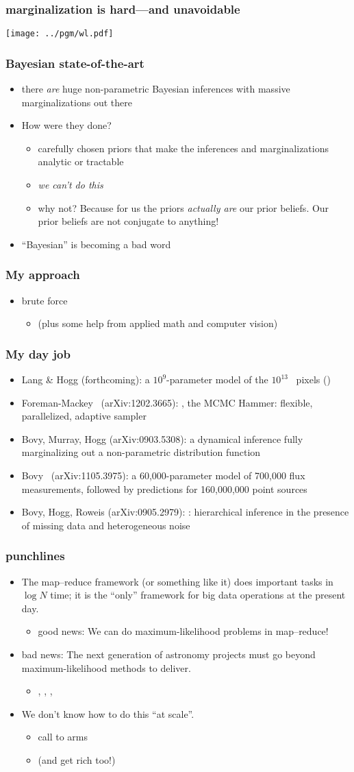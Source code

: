 \documentclass[pdftex]{beamer}
\newcommand{\conclusion}{
\begin{frame}
  \frametitle{punchlines}
  \begin{itemize}
  \item The map--reduce framework (or something like it) does
    important tasks in $\log N$ time; it is the ``only'' framework
    for big data operations at the present day.
    \begin{itemize}
    \item good news: We can do maximum-likelihood problems in map--reduce!
    \end{itemize}
  \item bad news:  The next generation of astronomy projects must go beyond
    maximum-likelihood methods to deliver.
    \begin{itemize}
    \item \gaia, \lsst, \euclid, \etc
    \end{itemize}
  \item We don't know how to do this ``at scale''.
    \begin{itemize}
    \item call to arms
    \item (and get rich too!)
    \end{itemize}
  \end{itemize}
\end{frame}
}
\begin{document}
\begin{frame}
  \frametitle{marginalization is hard---and unavoidable}
  \texttt{[image: ../pgm/wl.pdf]}
\end{frame}

\begin{frame}
  \frametitle{Bayesian state-of-the-art}
  \begin{itemize}
  \item there \emph{are} huge non-parametric Bayesian inferences with
    massive marginalizations out there
  \item How were they done?
    \begin{itemize}
    \item carefully chosen priors that make the inferences and
      marginalizations analytic or tractable
    \item \emph{we can't do this}
    \item why not?  Because for us the priors \emph{actually are} our
      prior beliefs.  Our prior beliefs are not conjugate to anything!
    \end{itemize}
  \item ``Bayesian'' is becoming a bad word
  \end{itemize}
\end{frame}

\begin{frame}
  \frametitle{My approach}
  \begin{itemize}
  \item brute force
    \begin{itemize}
    \item (plus some help from applied math and computer vision)
    \end{itemize}
  \end{itemize}
\end{frame}

\begin{frame}
  \frametitle{My day job}
  \begin{itemize}
  \item Lang \& Hogg {\small(forthcoming)}: a $10^9$-parameter model of the
    $10^{13}$ \sdss\ pixels ()
  \item Foreman-Mackey \etal\ {\small(arXiv:1202.3665)}:
    , the MCMC Hammer: flexible, parallelized, adaptive
    sampler
  \item Bovy, Murray, Hogg {\small(arXiv:0903.5308)}: a dynamical inference
    fully marginalizing out a non-parametric distribution function
  \item Bovy \etal\ {\small(arXiv:1105.3975)}: a 60,000-parameter model of
    700,000 flux measurements, followed by predictions for 160,000,000
    point sources
  \item Bovy, Hogg, Roweis {\small(arXiv:0905.2979)}: : hierarchical inference in the presence of missing
    data and heterogeneous noise
  \end{itemize}
\end{frame}

\conclusion
\end{document}
